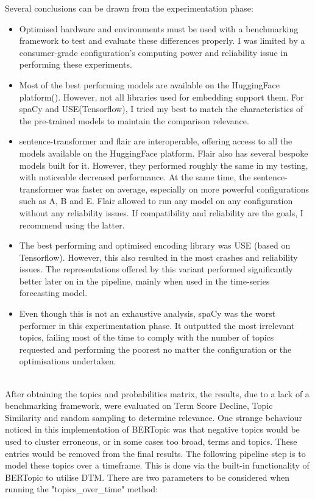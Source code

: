 \documentclass[12pt,MSc,a4paper,oneside]{muthesis}
\begin{document}
Several conclusions can be drawn from the experimentation phase:

\begin{itemize}
    \item Optimised hardware and environments must be used with a benchmarking framework to test and evaluate these differences properly. I was limited by a consumer-grade configuration's computing power and reliability issue in performing these experiments.
    \item Most of the best performing models are available on the HuggingFace platform(\cite{huggingface-models}). However, not all libraries used for embedding support them. For spaCy and USE(Tensorflow), I tried my best to match the characteristics of the pre-trained models to maintain the comparison relevance.
    \item  sentence-transformer and flair are interoperable, offering access to all the models available on the HuggingFace platform. Flair also has several bespoke models built for it. However, they performed roughly the same in my testing, with noticeable decreased performance. At the same time, the sentence-transformer was faster on average, especially on more powerful configurations such as A, B and E. Flair allowed to run any model on any configuration without any reliability issues. If compatibility and reliability are the goals, I recommend using the latter.
    \item The best performing and optimised encoding library was USE (based on Tensorflow). However, this also resulted in the most crashes and reliability issues. The representations offered by this variant performed significantly better later on in the pipeline, mainly when used in the time-series forecasting model.
    \item Even though this is not an exhaustive analysis, spaCy was the worst performer in this experimentation phase. It outputted the most irrelevant topics, failing most of the time to comply with the number of topics requested and performing the poorest no matter the configuration or the optimisations undertaken.
\end{itemize}\\


After obtaining the topics and probabilities matrix, the results, due to a lack of a benchmarking framework, were evaluated on Term Score Decline, Topic Similarity and random sampling to determine relevance.
One strange behaviour noticed in this implementation of BERTopic was that negative topics would be used to cluster erroneous, or in some cases too broad, terms and topics. These entries would be removed from the final results.
The following pipeline step is to model these topics over a timeframe. This is done via the built-in functionality of BERTopic to utilise DTM. There are two parameters to be considered when running the "topics\_over\_time" method:
\end{document}
